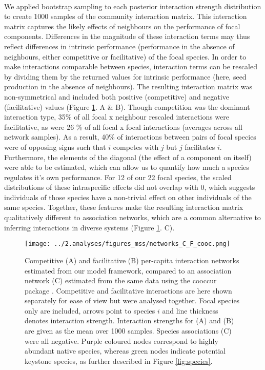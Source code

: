\documentclass[a4,12pt]{article}
\begin{document}
\begin{itemize}
    \paragraph{}
    We applied bootstrap sampling to each posterior interaction strength distribution to create 1000 samples of the community interaction matrix. This interaction matrix captures the likely effects of neighbours on the performance of focal components. Differences in the magnitude of these interaction terms may thus reflect differences in intrinsic performance (performance in the absence of neighbours, either competitive or facilitative) of the focal species. In order to make interactions comparable between species, interaction terms can be rescaled by dividing them by the returned values for intrinsic performance (here, seed production in the absence of neighbours). The resulting interaction matrix was non-symmetrical and included both positive (competitive) and negative (facilitative) values (Figure \ref{fig:netwks}. A \& B). Though competition was the dominant interaction type,  35\% of all focal x neighbour rescaled interactions were facilitative, as were 26 \% of all focal x focal interactions (averages across all network samples). As a result, 40\% of interactions between pairs of focal species were of opposing signs such that $i$ competes with $j$ but $j$ facilitates $i$. Furthermore, the elements of the diagonal (the effect of a component on itself) were able to be estimated, which can allow us to quantify how much a species regulates it's own performance. For 12 of our 22 focal species, the scaled distributions of these intraspecific effects did not overlap with 0, which suggests individuals of those species have a non-trivial effect on other individuals of the same species. Together, these features make the resulting interaction matrix qualitatively different to association networks, which are a common alternative to inferring interactions in diverse systems (Figure \ref{fig:netwks}. C). 


    \begin{figure}[H]
        \begin{centering}
        \texttt{[image: ../2.analyses/figures\_mss/networks\_C\_F\_cooc.png]}
        \caption{Competitive (A) and facilitative (B) per-capita interaction networks estimated from our model framework, compared to an association network (C) estimated from the same data using the cooccur package \parencite{Griffith2016}. Competitive and facilitative interactions are here shown separately for ease of view but were analysed together. Focal species only are included, arrows point to species $i$ and line thickness denotes interaction strength. Interaction strengths for (A) and (B) are given as the mean over 1000 samples. Species associations (C) were all negative. 
        Purple coloured nodes correspond to highly abundant native species, whereas green nodes indicate potential keystone species, as further described in Figure \ref{fig:species}. }
        \label{fig:netwks}
       \end{centering}
    \end{figure}    


\end{itemize}
\end{document}
